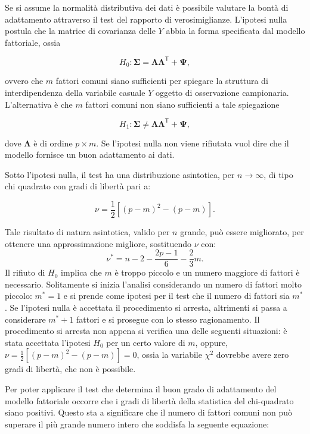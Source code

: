 \documentclass[
  11pt,
]{krantz}
\theoremstyle{definition}
\theoremstyle{definition}
\theoremstyle{definition}
\theoremstyle{definition}
\theoremstyle{remark}
\begin{document}
Se si assume la normalità distributiva dei dati è possibile valutare la bontà di adattamento attraverso il test del rapporto di verosimiglianze. L'ipotesi nulla postula che la matrice di covarianza delle \(Y\) abbia la forma specificata dal modello fattoriale, ossia

\[H_0: \boldsymbol{\Sigma} =  \boldsymbol{\Lambda}
  \boldsymbol{\Lambda}^{\ensuremath{\mathsf{T}}} +  \boldsymbol{\Psi},\]

ovvero che \(m\) fattori comuni siano sufficienti per spiegare la struttura di interdipendenza della variabile casuale \(Y\) oggetto di osservazione campionaria. L'alternativa è che \(m\) fattori comuni non siano sufficienti a tale spiegazione

\[H_1: \boldsymbol{\Sigma} \neq  \boldsymbol{\Lambda}
  \boldsymbol{\Lambda}^{\ensuremath{\mathsf{T}}} +  \boldsymbol{\Psi},\]

dove \(\boldsymbol{\Lambda}\) è di ordine \(p \times m\). Se l'ipotesi nulla non viene rifiutata vuol dire che il modello fornisce un buon adattamento ai dati.

Sotto l'ipotesi nulla, il test ha una distribuzione asintotica, per \(n \rightarrow \infty\), di tipo chi quadrato con gradi di libertà pari a:

\[\nu=\frac{1}{2}\left[ (p-m)^2 - (p - m) \right].\]

Tale risultato di natura asintotica, valido per \(n\) grande, può essere migliorato, per ottenere una approssimazione migliore, sostituendo \(\nu\) con: \[\nu^* = n - 2 - \frac{2p-1}{6}-\frac{2}{3}m.\] Il rifiuto di \(H_0\) implica che \(m\) è troppo piccolo e un numero maggiore di fattori è necessario. Solitamente si inizia l'analisi considerando un numero di fattori molto piccolo: \(m^*=1\) e si prende come ipotesi per il test che il numero di fattori sia \(m^*\). Se l'ipotesi nulla è accettata il procedimento si arresta, altrimenti si passa a considerare \(m^* + 1\) fattori e si prosegue con lo stesso ragionamento. Il procedimento si arresta non appena si verifica una delle seguenti situazioni: è stata accettata l'ipotesi \(H_0\) per un certo valore di \(m\), oppure, \(\nu=\frac{1}{2}\left[ (p-m)^2 - (p - m) \right]=0\), ossia la variabile \(\chi^2\) dovrebbe avere zero gradi di libertà, che non è possibile.

Per poter applicare il test che determina il buon grado di adattamento del modello fattoriale occorre che i gradi di libertà della statistica del chi-quadrato siano positivi. Questo sta a significare che il numero di fattori comuni non può superare il più grande numero intero che soddisfa la seguente equazione:
\end{document}
